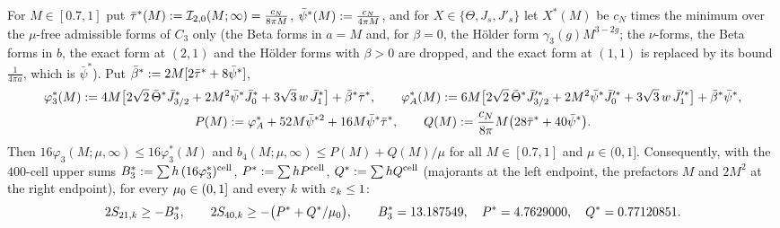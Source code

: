 \begin{lemma}\label{lem:s14:CF}
For $M\in[0.7,1]$ put $\bar\tau^*(M):=\mathcal I_{2,0}(M;\infty)=\frac{c_N}{8\pi M}$, $\bar\psi^*(M):=\frac{c_N}{4\pi M}$, and for $X\in\{\Theta,J_s,J'_s\}$ let $X^*(M)$ be $c_N$ times the minimum over the $\mu$-free admissible forms of $C_3$ only (the Beta forms in $a=M$ and, for $\beta=0$, the H\"older form $\gamma_3(g)M^{3-2g}$; the $\nu$-forms, the Beta forms in $b$, the exact form at $(2,1)$ and the H\"older forms with $\beta>0$ are dropped, and the exact form at $(1,1)$ is replaced by its bound $\frac1{4\pi a}$, which is $\bar\psi^*$). Put $\bar\beta^*:=2M[2\bar\tau^*+8\bar\psi^*]$,
\begin{gather*}
\varphi_3^*(M):=4M\big[2\sqrt2\,\bar\Theta^*\bar J^*_{3/2}+2M^2\bar\psi^*\bar J^*_0+3\sqrt3\,w\,\bar J^*_1\big]+\bar\beta^*\bar\tau^*,\qquad
\varphi_A^*(M):=6M\big[2\sqrt2\,\bar\Theta^*\bar J'^*_{3/2}+2M^2\bar\psi^*\bar J'^*_0+3\sqrt3\,w\,\bar J'^*_1\big]+\bar\beta^*\bar\psi^*,\\
P(M):=\varphi_A^*+52M\bar\psi^{*2}+16M\bar\psi^*\bar\tau^*,\qquad Q(M):=\frac{c_N}{8\pi}M\big(28\bar\tau^*+40\bar\psi^*\big).
\end{gather*}
Then $16\varphi_3(M;\mu,\infty)\le16\varphi_3^*(M)$ and $b_4(M;\mu,\infty)\le P(M)+Q(M)/\mu$ for all $M\in[0.7,1]$ and $\mu\in(0,1]$. Consequently, with the $400$-cell upper sums $B_3^*:=\sum h\,(16\varphi_3^*)^{\rm cell}$, $P^*:=\sum hP^{\rm cell}$, $Q^*:=\sum hQ^{\rm cell}$ (majorants at the left endpoint, the prefactors $M$ and $2M^2$ at the right endpoint), for every $\mu_0\in(0,1]$ and every $k$ with $\varepsilon_k\le1$:
\[
2S_{21,k}\ge-B_3^*,\qquad 2S_{40,k}\ge-\big(P^*+Q^*/\mu_0\big),\qquad B_3^*=13.187549,\quad P^*=4.7629000,\quad Q^*=0.77120851 .
\]
\end{lemma}

